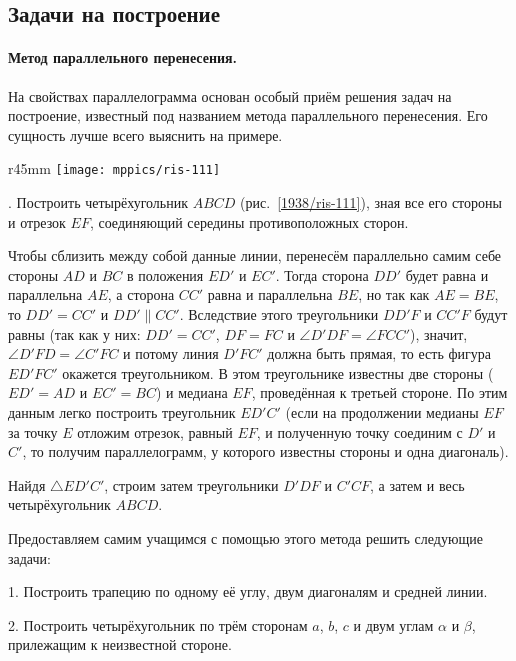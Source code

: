 {\small

\subsection*{Задачи на построение}


\paragraph{Метод параллельного перенесения.}\label{1938/101}
На свойствах параллелограмма основан особый приём решения задач на построение, известный под названием метода параллельного перенесения.
Его сущность лучше всего выяснить на примере.

\begin{wrapfigure}{r}{45mm}
\vskip-7mm
\centering
\texttt{[image: mppics/ris-111]}
\caption{}\label{1938/ris-111}
\end{wrapfigure}

\smallskip
\mbox{.}
Построить четырёхугольник $ABCD$ (рис.~\ref{1938/ris-111}), зная все его стороны и отрезок $EF$, соединяющий середины противоположных сторон.

Чтобы сблизить между собой данные линии, перенесём параллельно самим себе стороны $AD$ и $BC$ в положения $ED'$ и $EC'$.
Тогда сторона $DD'$ будет равна и параллельна $AE$, а сторона $CC'$ равна и параллельна $BE$, но так как $AE=BE$, то $DD'=CC'$ и $DD'\parallel CC'$.
Вследствие этого треугольники $DD'F$ и $CC'F$ будут равны (так как у них:
$DD' = CC'$, $DF=FC$ и $\angle D'DF=\angle FCC'$), значит, $\angle D'FD=\angle C'FC$ и потому линия $D'FC'$ должна быть прямая, то есть
фигура $ED'FC'$ окажется треугольником.
В этом треугольнике известны две стороны ($ED'=AD$ и $EC'=BC$) и медиана $EF$, проведённая к третьей стороне.
По этим данным легко построить треугольник $ED'C'$ (если на продолжении медианы $EF$ за точку $E$ отложим отрезок, равный $EF$, и полученную точку соединим с $D'$ и $C'$, то получим параллелограмм, у которого известны стороны и одна диагональ).

Найдя $\triangle ED'C'$, строим затем треугольники $D'DF$ и $C'CF$, а затем и весь четырёхугольник $ABCD$.

Предоставляем самим учащимся с помощью этого метода решить следующие задачи:

\medskip

1.
Построить трапецию по одному её углу, двум диагоналям и средней линии.

2.
Построить четырёхугольник по трём сторонам $a$, $b$, $c$ и двум углам $\alpha$ и $\beta$, прилежащим к неизвестной стороне.

}
